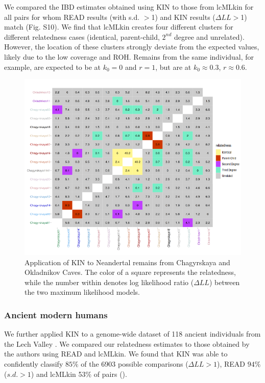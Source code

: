 \documentclass[12pt, letterpaper]{article}
\begin{document}
We compared the IBD estimates obtained using KIN to those from lcMLkin for all pairs for whom READ results (with s.d. $>$1) and KIN results ($\Delta LL>$1) match (Fig. S10). We find that lcMLkin creates four different clusters for different relatedness cases (identical, parent-child, $2^{nd}$ degree and unrelated). However, the location of these clusters strongly deviate from the expected values, likely due to the low coverage and ROH. Remains from the same individual, for example, are expected to be at $k_0 = 0$ and $r = 1$, but are at $k_0 \approx 0.3$, $r \approx 0.6$.


\begin{figure}[h!]
    \includegraphics[width=18cm]{plots/inkscape_finalImg/kinplot.png}
    \centering
    \caption{Application of KIN to Neandertal remains from Chagyrskaya and Okladnikov Caves. The color of a square represents the relatedness, while the number within denotes log likelihood ratio ($\Delta LL$) between the two maximum likelihood models.}
    \label{fig5:Chagyrskaya_KIN}
\end{figure}

\subsubsection{Ancient modern humans}

We further applied KIN to a genome-wide dataset of 118 ancient individuals from the Lech Valley \cite{mittnik_kinship-based_2019}. We compared our relatedness estimates to those obtained by the authors using READ and lcMLkin. We found that KIN was able to confidently classify $85\%$ of the 6903 possible comparisons ($\Delta LL>1$), READ $94\%$ ($s.d.>1$) and lcMLkin 53\% of pairs (\cite{mittnik_kinship-based_2019}). 
\end{document}
